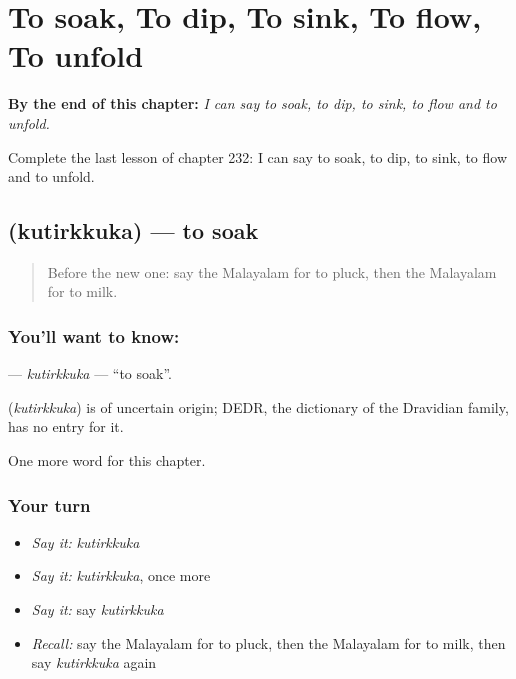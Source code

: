
\chapter{To soak, To dip, To sink, To flow, To unfold}
\label{ch:ml-to-soak-to-dip-to-sink-to-flow-to-unfold}

\begin{chapteropening}
\textbf{By the end of this chapter:} \emph{I can say to soak, to dip, to sink, to flow and to unfold.}

Complete the last lesson of chapter 232: I can say to soak, to dip, to sink, to flow and to unfold.
\end{chapteropening}

\section[\texorpdfstring{\ml{കുതിർക്കുക} (kutirkkuka)}{കുതിർക്കുക (kutirkkuka)}]{ (kutirkkuka) — to soak}

\label{lesson:ML-C232-kutirkkuka}



\begin{quote}
Before the new one: say the Malayalam for to pluck, then the Malayalam for to milk.
\end{quote}

\subsection*{You'll want to know: }
\textbf{} — \emph{kutirkkuka} — \textquotedblleft{}to soak\textquotedblright{}.

\begin{cousinweb}
\textbf{} (\emph{kutirkkuka}) is of uncertain origin; DEDR, the dictionary of the Dravidian family, has no entry for it.
\end{cousinweb}

\begin{grammarlens}[title={What you've built}]
One more word for this chapter.
\end{grammarlens}

\subsection*{Your turn}
\begin{itemize}
\raggedright
  \item \emph{Say it:} \emph{kutirkkuka}
  \item \emph{Say it:} \emph{kutirkkuka}, once more
  \item \emph{Say it:} say \emph{kutirkkuka}
  \item \emph{Recall:} say the Malayalam for to pluck, then the Malayalam for to milk, then say \emph{kutirkkuka} again
\end{itemize}

